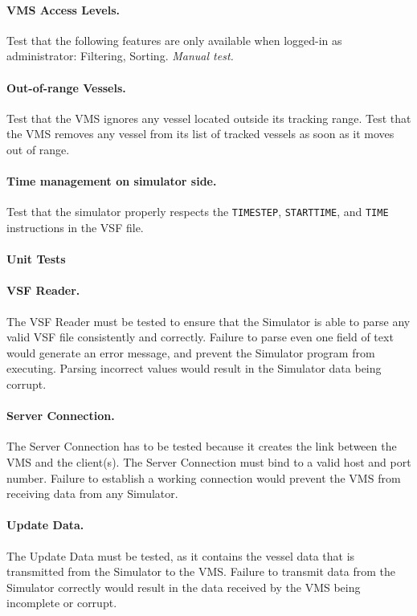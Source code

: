 \documentclass{article}
\begin{document}
\paragraph{VMS Access Levels.} Test that the following features are only available when logged-in as administrator: Filtering, Sorting. \emph{Manual test.}

\paragraph{Out-of-range Vessels.} Test that the VMS ignores any vessel located outside its tracking range. Test that the VMS removes any vessel from its list of tracked vessels as soon as it moves out of range.

\paragraph{Time management on simulator side.} Test that the simulator properly respects the \verb|TIMESTEP|, \verb|STARTTIME|, and \verb|TIME| instructions in the VSF file.

\paragraph{Unit Tests}

\paragraph{VSF Reader.} The VSF Reader must be tested to ensure that the Simulator is able to parse any valid VSF file consistently and correctly. Failure to parse even one field of text would generate an error message, and prevent the Simulator program from executing. Parsing incorrect values would result in the Simulator data being corrupt.

\paragraph{Server Connection.} The Server Connection has to be tested because it creates the link between the VMS and the client(s). The Server Connection must bind to a valid host and port number. Failure to establish a working connection would prevent the VMS from receiving data from any Simulator.

\paragraph{Update Data.} The Update Data must be tested, as it contains the vessel data that is transmitted from the Simulator to the VMS. Failure to transmit data from the Simulator correctly would result in the data received by the VMS being incomplete or corrupt.
\end{document}
